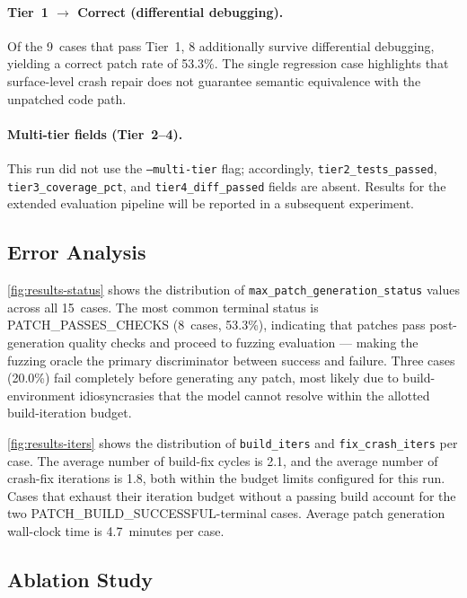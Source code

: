 \paragraph{Tier~1 $\rightarrow$ Correct (differential debugging).}
Of the 9~cases that pass Tier~1, 8 additionally survive differential debugging,
yielding a correct patch rate of 53.3\%.
The single regression case highlights that surface-level crash repair does not
guarantee semantic equivalence with the unpatched code path.

\paragraph{Multi-tier fields (Tier~2--4).}
This run did not use the \texttt{--multi-tier} flag; accordingly, \texttt{tier2\_tests\_passed},
\texttt{tier3\_coverage\_pct}, and \texttt{tier4\_diff\_passed} fields are absent.
Results for the extended evaluation pipeline will be reported in a subsequent experiment.

\subsection{Error Analysis}
\label{sec:results-errors}

\autoref{fig:results-status} shows the distribution of
\texttt{max\_patch\_generation\_status} values across all 15~cases.
The most common terminal status is \textsc{PATCH\_PASSES\_CHECKS} (8~cases, 53.3\%),
indicating that patches pass post-generation quality checks and proceed to fuzzing
evaluation — making the fuzzing oracle the primary discriminator between success
and failure.
Three cases (20.0\%) fail completely before generating any patch, most likely
due to build-environment idiosyncrasies that the model cannot resolve within the
allotted build-iteration budget.

\autoref{fig:results-iters} shows the distribution of \texttt{build\_iters} and
\texttt{fix\_crash\_iters} per case.
The average number of build-fix cycles is 2.1, and the average number of
crash-fix iterations is 1.8, both within the budget limits configured for this
run.
Cases that exhaust their iteration budget without a passing build account for the
two \textsc{PATCH\_BUILD\_SUCCESSFUL}-terminal cases.
Average patch generation wall-clock time is 4.7~minutes per case.

\subsection{Ablation Study}
\label{sec:results-ablation}

